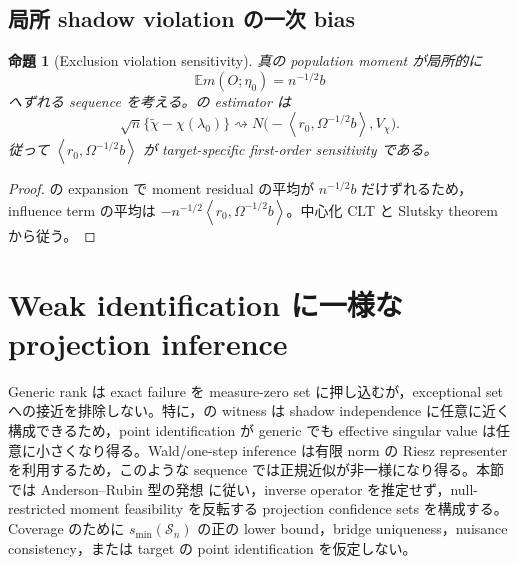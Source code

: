 \documentclass[11pt,a4paper]{ltjsarticle}
\newtheorem{proposition}{命題}[section]
\theoremstyle{remark}
\newcommand{\E}{\mathbb E}
\newcommand{\wt}{\widetilde}
\newcommand{\inner}[2]{\left\langle#1,#2\right\rangle}
\newcommand{\Sop}{\mathscr S}
\begin{document}
\subsection{局所 shadow violation の一次 bias}
\begin{proposition}[Exclusion violation sensitivity]\label{prop:violationbias}
真の population moment が局所的に
\[
\E m(O;\eta_0)=n^{-1/2}b
\]
へずれる sequence を考える。の estimator は
\begin{equation}
\sqrt n\{\wt\chi-\chi(\lambda_0)\}
\rightsquigarrow N\bigl(-\inner{r_0}{\Omega^{-1/2}b},V_\chi\bigr).
\label{eq:localbias}
\end{equation}
従って $\inner{r_0}{\Omega^{-1/2}b}$ が target-specific first-order sensitivity である。
\end{proposition}

\begin{proof}
の expansion で moment residual の平均が $n^{-1/2}b$ だけずれるため，influence term の平均は $-n^{-1/2}\inner{r_0}{\Omega^{-1/2}b}$。中心化 CLT と Slutsky theorem から従う。
\end{proof}

\section{Weak identification に一様な projection inference}\label{sec:weakuniform}

Generic rank は exact failure を measure-zero set に押し込むが，exceptional set への接近を排除しない。特に，の witness は shadow independence に任意に近く構成できるため，point identification が generic でも effective singular value は任意に小さくなり得る。Wald/one-step inference は有限 norm の Riesz representer を利用するため，このような sequence では正規近似が非一様になり得る。本節では Anderson--Rubin 型の発想 \cite{AndersonRubin1949,StockWright2000,Kleibergen2005} に従い，inverse operator を推定せず，null-restricted moment feasibility を反転する projection confidence sets を構成する。Coverage のために $s_{\min}(\Sop_n)$ の正の lower bound，bridge uniqueness，nuisance consistency，または target の point identification を仮定しない。
\end{document}

